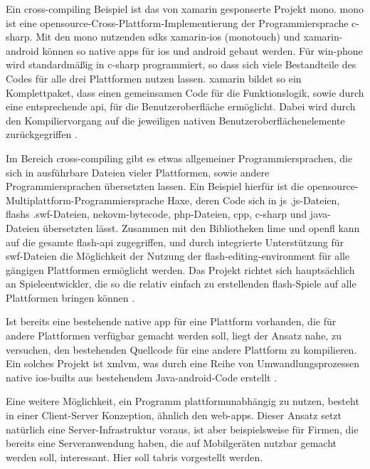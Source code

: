 Ein \gls{cross-compiling} Beispiel ist das von \gls{xamarin} gesponserte Projekt \gls{mono}. \gls{mono} ist eine \gls{opensource}-Cross-Plattform-Implementierung der Programmiersprache \gls{c-sharp}. Mit den \gls{mono} nutzenden \glspl{sdk} \gls{xamarin-ios} (\gls{monotouch}) und \gls{xamarin-android} können so native \glspl{app} für \gls{ios} und \gls{android} gebaut werden. Für \gls{win-phone} wird standardmäßig in \gls{c-sharp} programmiert, so dass sich viele Bestandteile des Codes für alle drei Plattformen nutzen lassen.
\gls{xamarin} bildet so ein Komplettpaket, dass einen gemeinsamen Code für die Funktionslogik, sowie durch eine entsprechende \gls{api}, für die Benutzeroberfläche ermöglicht. Dabei wird durch den Kompiliervorgang auf die jeweiligen nativen Benutzeroberflächenelemente zurückgegriffen \cite{Mono_Projekt}.

Im Bereich \gls{cross-compiling} gibt es etwas allgemeiner Programmiersprachen, die sich in ausführbare Dateien vieler Plattformen, sowie andere Programmiersprachen übersetzten lassen. Ein Beispiel hierfür ist die \gls{opensource}-Multiplattform-Programmiersprache Haxe, deren Code sich in \gls{js} .js-Dateien, \glspl{flash} .swf-Dateien, \gls{nekovm}-\gls{bytecode}, \gls{php}-Dateien, \gls{cpp}, \gls{c-sharp} und \gls{java}-Dateien übersetzten lässt. Zusammen mit den Bibliotheken \gls{lime} und \gls{openfl} kann auf die gesamte \gls{flash}-\gls{api} zugegriffen, und durch integrierte Unterstützung für \gls{swf}-Dateien die Möglichkeit der Nutzung der \gls{flash-editing-environment} für alle gängigen Plattformen ermöglicht werden. Das Projekt richtet sich hauptsächlich an Spieleentwickler, die so die relativ einfach zu erstellenden \gls{flash}-Spiele auf alle Plattformen bringen können \cite{Haxe, OpenFL}.

Ist bereits eine bestehende native \gls{app} für eine Plattform vorhanden, die für andere Plattformen verfügbar gemacht werden soll, liegt der Ansatz nahe, zu versuchen, den bestehenden Quellcode für eine andere Plattform zu kompilieren. Ein solches Projekt ist \gls{xmlvm}, was durch eine Reihe von Umwandlungsprozessen native \gls{ios}-\glspl{built} aus bestehendem Java-\gls{android}-Code erstellt \cite{XMLVM}.

Eine weitere Möglichkeit, ein Programm plattformunabhängig zu nutzen, besteht in einer Client-Server Konzeption, ähnlich den \glspl{web-app}. Dieser Ansatz setzt natürlich eine Server-Infrastruktur voraus, ist aber beispielsweise für Firmen, die bereits eine Serveranwendung haben, die auf Mobilgeräten nutzbar gemacht werden soll, interessant.
Hier soll \gls{tabris} vorgestellt werden.

